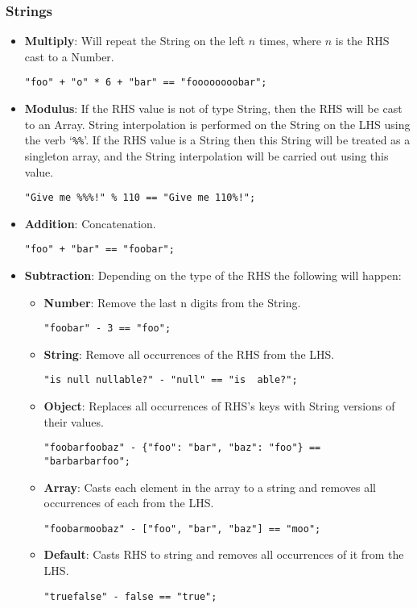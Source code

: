 \subsubsection{Strings}

\begin{itemize}
    \item \textbf{Multiply}: Will repeat the String on the left $n$ times, where $n$ is the RHS cast to a Number.
    \begin{verbatim}
"foo" + "o" * 6 + "bar" == "foooooooobar";
    \end{verbatim}
    \item \textbf{Modulus}: If the RHS value is not of type String, then the RHS will be cast to an Array. String interpolation is performed on the String on the LHS using the verb `\verb|%%|'. If the RHS value is a String then this String will be treated as a singleton array, and the String interpolation will be carried out using this value.
    \begin{verbatim}
"Give me %%%!" % 110 == "Give me 110%!";
    \end{verbatim}
    \item \textbf{Addition}: Concatenation.
    \begin{verbatim}
"foo" + "bar" == "foobar";
    \end{verbatim}
    \item \textbf{Subtraction}: Depending on the type of the RHS the following will happen:
    \begin{itemize}
        \item \textbf{Number}:  Remove the last n digits from the String.
        \begin{verbatim}
"foobar" - 3 == "foo";
        \end{verbatim}
        \item \textbf{String}:  Remove all occurrences of the RHS from the LHS.
        \begin{verbatim}
"is null nullable?" - "null" == "is  able?";
        \end{verbatim}
        \item \textbf{Object}:  Replaces all occurrences of RHS's keys with String versions of their values.
        \begin{verbatim}
"foobarfoobaz" - {"foo": "bar", "baz": "foo"} == "barbarbarfoo";
        \end{verbatim}
        \item \textbf{Array}:   Casts each element in the array to a string and removes all occurrences of each from the LHS.
        \begin{verbatim}
"foobarmoobaz" - ["foo", "bar", "baz"] == "moo";
        \end{verbatim}
        \item \textbf{Default}: Casts RHS to string and removes all occurrences of it from the LHS.
        \begin{verbatim}
"truefalse" - false == "true";
        \end{verbatim}
    \end{itemize}
\end{itemize}

